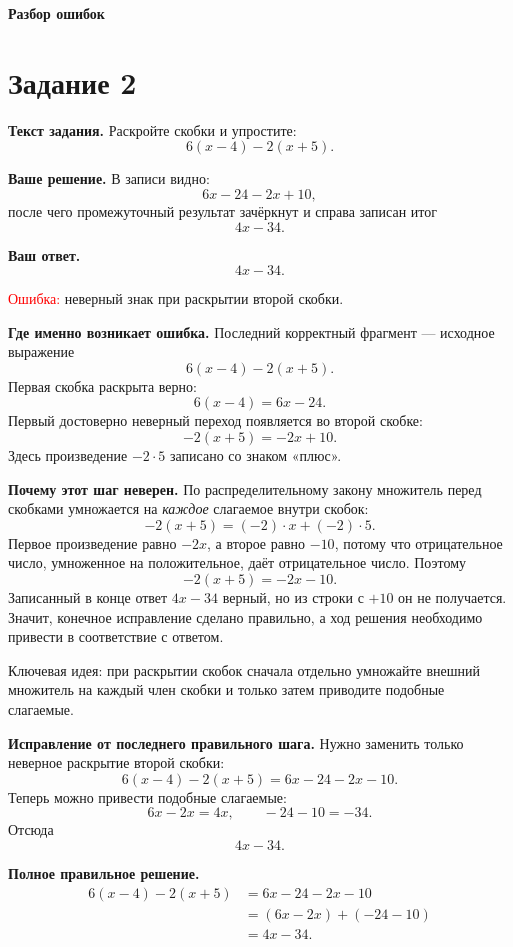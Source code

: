 \documentclass[12pt,a4paper]{article}
\begin{document}
\newpage
\thispagestyle{empty}
\vspace*{\fill}
\begin{center}
{\LARGE\bfseries Разбор ошибок}
\end{center}
\vspace*{\fill}

\newpage
{}\label{task:2}
\section*{Задание 2}

\textbf{Текст задания.}
Раскройте скобки и упростите:
\[
6(x-4)-2(x+5).
\]

\textbf{Ваше решение.}
В записи видно:
\[
6x-24-2x+10,
\]
после чего промежуточный результат зачёркнут и справа записан итог
\[
4x-34.
\]

\textbf{Ваш ответ.}
\[
4x-34.
\]

\textcolor{red}{Ошибка:} неверный знак при раскрытии второй скобки.

\textbf{Где именно возникает ошибка.}
Последний корректный фрагмент --- исходное выражение
\[
6(x-4)-2(x+5).
\]
Первая скобка раскрыта верно:
\[
6(x-4)=6x-24.
\]
Первый достоверно неверный переход появляется во второй скобке:
\[
-2(x+5)=-2x+10.
\]
Здесь произведение $-2\cdot 5$ записано со знаком «плюс».

\textbf{Почему этот шаг неверен.}
По распределительному закону множитель перед скобками умножается на \emph{каждое} слагаемое внутри скобок:
\[
-2(x+5)=(-2)\cdot x+(-2)\cdot 5.
\]
Первое произведение равно $-2x$, а второе равно $-10$, потому что отрицательное число, умноженное на положительное, даёт отрицательное число. Поэтому
\[
-2(x+5)=-2x-10.
\]
Записанный в конце ответ $4x-34$ верный, но из строки с $+10$ он не получается. Значит, конечное исправление сделано правильно, а ход решения необходимо привести в соответствие с ответом.

\textcolor{blue!60!black}{Ключевая идея:} при раскрытии скобок сначала отдельно умножайте внешний множитель на каждый член скобки и только затем приводите подобные слагаемые.

\textbf{Исправление от последнего правильного шага.}
Нужно заменить только неверное раскрытие второй скобки:
\[
6(x-4)-2(x+5)=6x-24-2x-10.
\]
Теперь можно привести подобные слагаемые:
\[
6x-2x=4x,
\qquad
-24-10=-34.
\]
Отсюда
\[
4x-34.
\]

\textbf{Полное правильное решение.}
\[
\begin{aligned}
6(x-4)-2(x+5)
&=6x-24-2x-10\\
&=(6x-2x)+(-24-10)\\
&=4x-34.
\end{aligned}
\]
\end{document}
